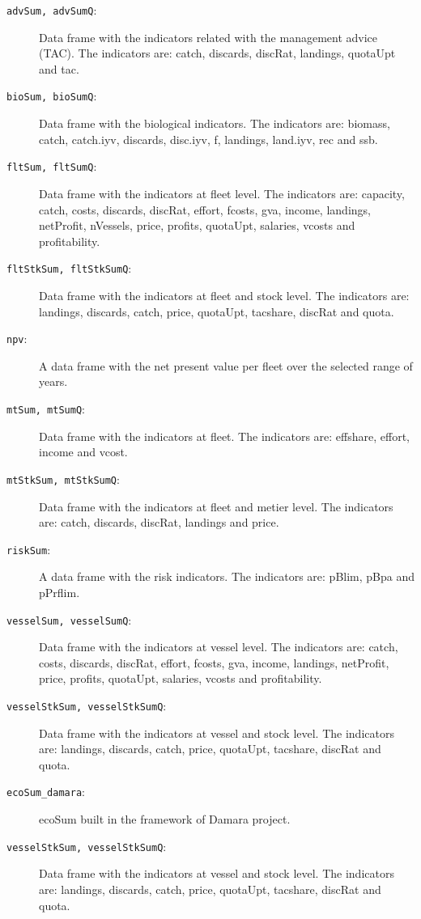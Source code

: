 \begin{description}
    \item[\texttt{advSum, advSumQ}:] Data frame with the indicators related with the management advice (TAC). 
      The indicators are: catch, discards, discRat, landings, quotaUpt and tac.
    \item[\texttt{bioSum, bioSumQ}:] Data frame with the biological indicators. 
      The indicators are: biomass, catch, catch.iyv, discards, disc.iyv, f, landings, land.iyv, rec and ssb.
    \item[\texttt{fltSum, fltSumQ}:] Data frame with the indicators at fleet level. 
      The indicators are: capacity, catch, costs, discards, discRat, effort, fcosts, gva, income, landings, netProfit, 
      nVessels, price, profits, quotaUpt, salaries, vcosts and profitability.
    \item[\texttt{fltStkSum, fltStkSumQ}:] Data frame with the indicators at fleet and stock level. 
      The indicators are: landings, discards, catch, price, quotaUpt, tacshare, discRat and quota.
    \item[\texttt{npv}:] A data frame with the net present value per fleet over the selected range of years.
    \item[\texttt{mtSum, mtSumQ}:] Data frame with the indicators at fleet. 
      The indicators are: effshare, effort, income and vcost.
    \item[\texttt{mtStkSum, mtStkSumQ}:] Data frame with the indicators at fleet and metier level. 
      The indicators are: catch, discards, discRat, landings and price.
    \item[\texttt{riskSum}:] A data frame with the risk indicators. 
      The indicators are: pBlim, pBpa and pPrflim.
    \item[\texttt{vesselSum, vesselSumQ}:] Data frame with the indicators at vessel level. 
      The indicators are: catch, costs, discards, discRat, effort, fcosts, gva, income, landings, netProfit, 
      price, profits, quotaUpt, salaries, vcosts and profitability.
    \item[\texttt{vesselStkSum, vesselStkSumQ}:] Data frame with the indicators at vessel and stock level. 
      The indicators are: landings, discards, catch, price, quotaUpt, tacshare, discRat and quota.

    \item[\texttt{ecoSum\_damara}:] ecoSum built in the framework of Damara project.
    
    \item[\texttt{vesselStkSum, vesselStkSumQ}:] Data frame with the indicators at vessel and stock level. 
      The indicators are: landings, discards, catch, price, quotaUpt, tacshare, discRat and quota.

  \end{description}
  
